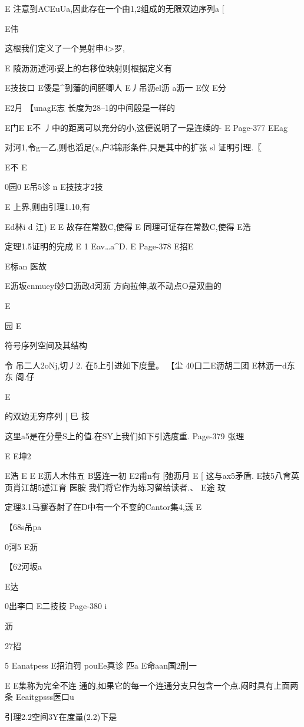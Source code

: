 {{{{{{{{{{{{{{{E
注意到ACEuUa,因此存在一个由1,2组成的无限双边序列a
[

E伟

这根我们定义了一个晃射申4>罗,

E
陵沥沥述河i妥上的右移位映射则根据定义有

E技技口
E倭是^到藩的间胚唧人
E丿吊沥el沥
a沥一
E仪
E分

E2月
【unagE志
长度为28--1的中间殷是一样的

E门E
E不
丿中的距离可以充分的小,这便说明了一是连续的-
E
Page-377
EEag

对河1,令g一乙,则也滔足(x,户3锦形条件,只是其中的扩张
sl
证明引理.〖

E不
E

0园0
E吊5诊
n
E技技才2技

E
上界,则由引理1.10,有

Ed林i
d
江)
E
E
故存在常数C,使得
E
同理可证存在常数C,使得
E浩

定理1.5证明的完成
E
1
Eav…a^D.
E
Page-378
E招E

E标an
医故

E沥坂cnmueyf妙口沥政d河沥
方向拉伸,故不动点O是双曲的

E

园
E

符号序列空间及其结构

令
吊二人2oNj,切丿2.
在5上引进如下度量。
【尘
40口二E沥胡二团
E林沥一d东东
阁.仔

E

的双边无穷序列
[
巳
技

这里a5是在分量S上的值.在SY上我们如下引选度重.
Page-379
张理

E
E坤2

E浩
E
E
E沥人木伟五
B竖连一初
E2甫n有
[弛沥月
E
[
这与ax5矛盾.
E技5八育英页肖江胡5述江育
医胺
我们将它作为练习留给读者.、
E途
玟

定理3.1马蹇春射了在D中有一个不变的Cantor集4,漾
E

【68s吊pa

0河5
E沥

【62河坂a

E达

0出李口
E二技技
Page-380
i

沥

27招

5
Eanatpess
E招泊罚
pouEe真诊
匹a
E命aan国2刑一

E
E集称为完全不连
通的,如果它的每一个连通分支只包含一个点.闷时具有上面两条
Eeaitgpsss医口u

引理2.2空间3Y在度量(2.2)下是

}}}}}}}}}}}}}}}
